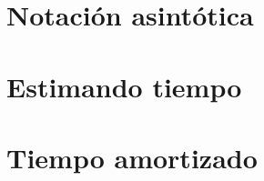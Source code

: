 \lipsum[1-1]

\section{Notación asintótica}
\lipsum[2-4]

\section{Estimando tiempo}
\lipsum[2-4]

\section{Tiempo amortizado}
\lipsum[2-4]
